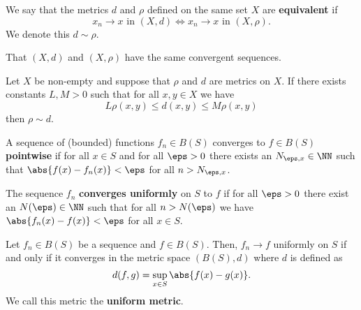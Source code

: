 \documentclass[12pt, a4paper]{article}
\begin{document}
\begin{definition}
    We say that the metrics \(d\) and \(\rho\) defined on the same set \(X\) are \textbf{equivalent} if 
    \[x_n \to x \text{ in } (X,d) \iff x_n \to x \text{ in } (X,\rho).\]
    We denote this \(d\sim \rho\).
\end{definition}

\begin{mdnote}
    That \((X,d)\) and \((X,\rho)\) have the same convergent sequences.
\end{mdnote}

\begin{mdthm}
    Let \(X\) be non-empty and suppose that \(\rho\) and \(d\) are metrics on \(X\). If there exists constants \(L,M>0\) such that for all \(x,y \in X\) we have 
    \[L\rho(x,y) \leq d(x,y) \leq M\rho(x,y)\]
    then \(\rho \sim d\).
\end{mdthm}

\begin{definition}
    A sequence of (bounded) functions \(f_n \in B(S)\) converges to \(f \in B(S)\) \textbf{pointwise} if for all \(x \in S\) and for all \(\eps>0\) there exists an \(N_{\eps,x} \in \NN\) such that \(\abs{f(x)-f_n(x)} < \eps\) for all \(n>N_{\eps,x}\). 
\end{definition}

\begin{definition}
    The sequence \(f_n\) \textbf{converges uniformly} on \(S\) to \(f\) if for all \(\eps >0\) there exist an \(N(\eps) \in \NN\) such that for all \(n>N(\eps)\) we have \(\abs{f_n(x)-f(x)}<\eps\) for all \(x \in S\).
\end{definition}

\begin{mdlemma}
    Let \(f_n \in B(S)\) be a sequence and \(f \in B(S)\). Then, \(f_n \to f\) uniformly on \(S\) if and only if it converges in the metric space \((B(S),d)\) where \(d\) is defined as
    \[d(f,g) = \sup_{x\in S} \abs{f(x)-g(x)}.\]
    We call this metric the \textbf{uniform metric}.
\end{mdlemma}
\end{document}
